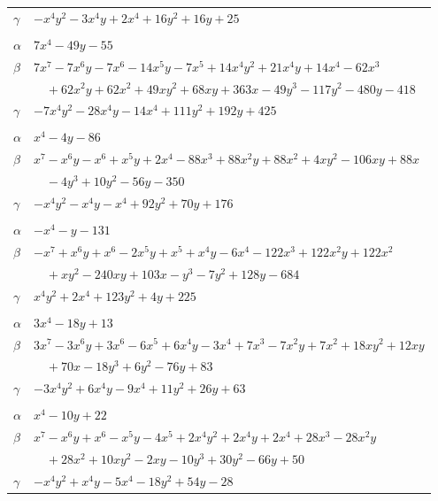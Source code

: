 \documentclass[11pt]{article}
\begin{document}
\begin{longtable}{@{}ll@{}}
$\gamma$ & $-x^{4}y^{2}-3x^{4}y+2x^{4}+16y^{2}+16y+25$\\
\addlinespace[3pt]
\multicolumn{2}{@{}l}{$\{i,j\}=\{6,23\}$, $k_{ij}=2^{4}\cdot 3$}\\
$\alpha$ & $7x^{4}-49y-55$\\
$\beta$ & $7x^{7}-7x^{6}y-7x^{6}-14x^{5}y-7x^{5}+14x^{4}y^{2}+21x^{4}y+14x^{4}-62x^{3}$\\
 & $\quad +62x^{2}y+62x^{2}+49xy^{2}+68xy+363x-49y^{3}-117y^{2}-480y-418$\\
$\gamma$ & $-7x^{4}y^{2}-28x^{4}y-14x^{4}+111y^{2}+192y+425$\\
\addlinespace[3pt]
\multicolumn{2}{@{}l}{$\{i,j\}=\{6,26\}$, $k_{ij}=2^{2}\cdot 5\cdot 13$}\\
$\alpha$ & $x^{4}-4y-86$\\
$\beta$ & $x^{7}-x^{6}y-x^{6}+x^{5}y+2x^{4}-88x^{3}+88x^{2}y+88x^{2}+4xy^{2}-106xy+88x$\\
 & $\quad -4y^{3}+10y^{2}-56y-350$\\
$\gamma$ & $-x^{4}y^{2}-x^{4}y-x^{4}+92y^{2}+70y+176$\\
\addlinespace[3pt]
\multicolumn{2}{@{}l}{$\{i,j\}=\{6,36\}$, $k_{ij}=2^{4}\cdot 5\cdot 13$}\\
$\alpha$ & $-x^{4}-y-131$\\
$\beta$ & $-x^{7}+x^{6}y+x^{6}-2x^{5}y+x^{5}+x^{4}y-6x^{4}-122x^{3}+122x^{2}y+122x^{2}$\\
 & $\quad +xy^{2}-240xy+103x-y^{3}-7y^{2}+128y-684$\\
$\gamma$ & $x^{4}y^{2}+2x^{4}+123y^{2}+4y+225$\\
\addlinespace[3pt]
\multicolumn{2}{@{}l}{$\{i,j\}=\{7,19\}$, $k_{ij}=2\cdot 5\cdot 7$}\\
$\alpha$ & $3x^{4}-18y+13$\\
$\beta$ & $3x^{7}-3x^{6}y+3x^{6}-6x^{5}+6x^{4}y-3x^{4}+7x^{3}-7x^{2}y+7x^{2}+18xy^{2}+12xy$\\
 & $\quad +70x-18y^{3}+6y^{2}-76y+83$\\
$\gamma$ & $-3x^{4}y^{2}+6x^{4}y-9x^{4}+11y^{2}+26y+63$\\
\addlinespace[3pt]
\multicolumn{2}{@{}l}{$\{i,j\}=\{7,31\}$, $k_{ij}=2^{3}\cdot 7$}\\
$\alpha$ & $x^{4}-10y+22$\\
$\beta$ & $x^{7}-x^{6}y+x^{6}-x^{5}y-4x^{5}+2x^{4}y^{2}+2x^{4}y+2x^{4}+28x^{3}-28x^{2}y$\\
 & $\quad +28x^{2}+10xy^{2}-2xy-10y^{3}+30y^{2}-66y+50$\\
$\gamma$ & $-x^{4}y^{2}+x^{4}y-5x^{4}-18y^{2}+54y-28$\\

\end{longtable}
\end{document}

